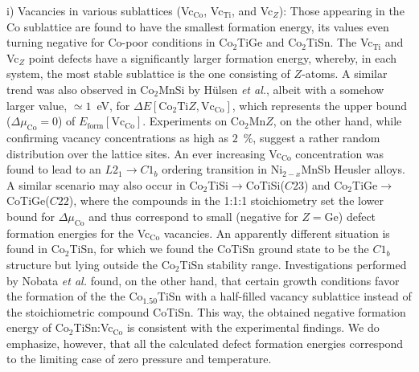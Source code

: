 \documentclass[aps,prb,twocolumn,superscriptaddress,showpacs]{revtex4}
\newcommand{\EQ}[1]{Eq.~(\ref{#1})}
\newcommand{\ea}{{\it et al.}}
\begin{document}
\begin{table*}
{\begin{tabular}{l||rr|rr|rr}
                           \hline\hline
  \end{tabular}}
  \caption{Formation energy $E_\text{form}$ 
    for  the native defects in 
    Co$_2$Ti$Z$ ($Z$ = Si, Ge, Sn), calculated using
    128-atom supercells within the pseudopotential plane wave method.
    The formation energy entries, derived from \protect\EQ{EformShort},
     are given as an
    interval $(E_\text{form}^\text{min},E_\text{form}^\text{max})$ 
    corresponding to the  
    lower and upper bounds of the chemical potentials $\Delta\mu_i$
    and/or their combinations. Also listed are the reference
    values $\Delta E(\text{Co}_2\text{Ti}Z,D)$ defined by 
    \protect\EQ{DeltaEform}.
    For the stoichiometric defects 'A$\leftrightarrow$B' all these
    quantities are equal.}
  \label{TabEformDefMinMax}            
\end{table*}


i) Vacancies in various sublattices (Vc$_\text{Co}$, Vc$_\text{Ti}$,
and Vc$_Z$): Those appearing in the Co sublattice are found to have
the smallest formation energy, its values even turning negative
for Co-poor conditions in Co$_2$TiGe and Co$_2$TiSn.
The Vc$_\text{Ti}$ and Vc$_Z$ point defects have a significantly
larger formation energy, whereby, in each system, 
the most stable sublattice is the one consisting of $Z$-atoms.
A similar trend was also observed in Co$_2$MnSi by
H\"ulsen \ea\cite{HSK09b}, albeit with a somehow larger value,
$\simeq 1$~eV,
for $\Delta E[\text{Co}_2\text{Ti}Z,\text{Vc}_\text{Co}]$,
which represents the upper bound ($\Delta\mu_\text{Co}=0$) of 
$E_\text{form}[\text{Vc}_\text{Co}]$.
Experiments on Co$_2$Mn$Z$, on the
other hand,\cite{KKFH09} while confirming vacancy concentrations 
as high as $2$~\%, suggest a rather
random distribution over the lattice sites.
An ever increasing Vc$_\text{Co}$ concentration was found
to lead to an $L2_1$$\to$$C1_b$ ordering transition 
in Ni$_{2-x}$MnSb Heusler alloys.\cite{NTM+15}
A similar scenario may also occur in Co$_2$TiSi$\to$CoTiSi($C23$)
and Co$_2$TiGe$\to$CoTiGe($C22$), where the compounds in 
the 1:1:1 stoichiometry set the lower bound for $\Delta\mu_\text{Co}$
and thus correspond to small (negative for $Z=$Ge) defect formation
energies for the Vc$_\text{Co}$ vacancies. 
An apparently different situation is found in Co$_2$TiSn, for which we
found the CoTiSn ground state to be the $C1_b$ structure but lying 
outside the Co$_2$TiSn stability range. Investigations performed 
by Nobata \ea\cite{NNK+02} found, on the other hand, 
that certain growth conditions favor the formation of the 
the Co$_{1.50}$TiSn with a half-filled vacancy sublattice
instead of the stoichiometric compound CoTiSn. This way, the 
obtained negative formation energy of Co$_2$TiSn:Vc$_\text{Co}$ is
consistent with the experimental findings. We do emphasize, 
however, that all the calculated defect formation energies correspond
to the limiting case of zero pressure and temperature.
\end{document}
